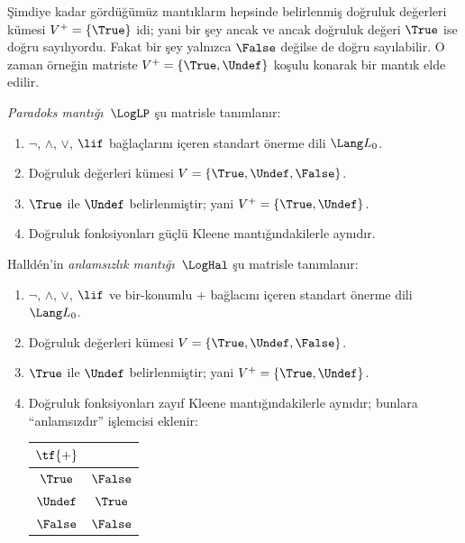 \documentclass[../../../include/open-logic-section]{subfiles}
\begin{document}


Şimdiye kadar gördüğümüz mantıkların hepsinde belirlenmiş doğruluk değerleri
kümesi $V^+ = \{\True\}$ idi; yani bir şey ancak ve ancak doğruluk değeri
$\True$ ise doğru sayılıyordu. Fakat bir şey yalnızca $\False$ değilse de
doğru sayılabilir. O zaman örneğin matriste
$V^+ = \{\True, \Undef\}$ koşulu konarak bir mantık elde edilir.

\begin{defn}
\emph{Paradoks mantığı}~$\LogLP$ şu matrisle tanımlanır:
\begin{enumerate}
  \item $\lnot$, $\land$, $\lor$, $\lif$ bağlaçlarını içeren standart
  önerme dili $\Lang L_0$.
  \item Doğruluk değerleri kümesi $V = \{\True, \Undef, \False\}$.
  \item $\True$ ile $\Undef$ belirlenmiştir; yani
  $V^+ = \{\True, \Undef\}$.
  \item Doğruluk fonksiyonları güçlü Kleene mantığındakilerle aynıdır.
\end{enumerate}
\end{defn}

\begin{defn}
Halld\'en'in \emph{anlamsızlık mantığı}~$\LogHal$ şu matrisle tanımlanır:
\begin{enumerate}
  \item $\lnot$, $\land$, $\lor$, $\lif$ ve bir-konumlu $+$ bağlacını
  içeren standart önerme dili $\Lang L_0$.
  \item Doğruluk değerleri kümesi $V = \{\True, \Undef, \False\}$.
  \item $\True$ ile $\Undef$ belirlenmiştir; yani
  $V^+ = \{\True, \Undef\}$.
  \item Doğruluk fonksiyonları zayıf Kleene mantığındakilerle aynıdır;
  bunlara “anlamsızdır” işlemcisi eklenir:
  \begin{center}
    \begin{tabular}{c|c} 
    $\tf{+}$ & \\ 
    \hline  
    $\True$ & $\False$ \\ 
    $\Undef$ & $\True$ \\
    $\False$ & $\False$ 
    \end{tabular}
  \end{center}
\end{enumerate}
\end{defn}
\end{document}
